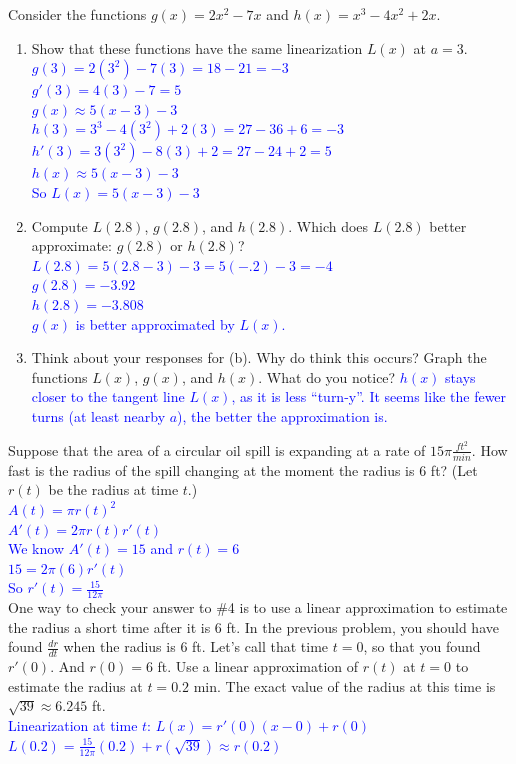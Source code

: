 \documentclass{ximera}
\begin{document}
\begin{exercise}
   Consider the functions $g(x)=2x^{2}-7x$ and $h(x)=x^{3}-4x^{2}+2x$. 
   \begin{enumerate}
       \item Show that these functions have the same linearization $L(x)$ at $a=3$.
        \textcolor{blue}{ $g(3)=2(3^2)-7(3)=18-21=-3$\\
        $g'(3)=4(3)-7=5$\\
        $g(x)\approx 5(x-3)-3$\\
        $h(3)=3^3-4(3^2)+2(3)=27-36+6=-3$\\
        $h'(3)=3(3^2)-8(3)+2=27-24+2=5$\\
        $h(x)\approx 5(x-3)-3$\\
        So $L(x)=5(x-3)-3$}
    
        
        \item Compute $L(2.8)$, $g(2.8)$, and $h(2.8)$. Which does $L(2.8)$ better approximate: $g(2.8)$ or $h(2.8)$? \\
        \textcolor{blue}{ $L(2.8)=5(2.8-3)-3=5(-.2)-3=-4$\\
        $g(2.8)=-3.92$\\
        $h(2.8)=-3.808$\\
        $g(x)$ is better approximated by $L(x)$.}
        
        \item Think about your responses for (b). Why do think this occurs? Graph the functions $L(x)$, $g(x)$, and $h(x)$. What do you notice?
        \textcolor{blue}{ $h(x)$ stays closer to the tangent line $L(x)$, as it is less ``turn-y''.  It seems like the fewer turns (at least nearby $a$), the better the approximation is.}
   \end{enumerate}
\end{exercise}

\begin{exercise}
   Suppose that the area of a circular oil spill is expanding at a rate of $15\pi \frac{ft^2}{min}$.  How fast is the radius of the spill changing at the moment the radius is 6 ft? (Let $r(t)$ be the radius at time $t$.) \\
   \textcolor{blue} {$A(t)=\pi r(t)^2$ \\
   $A'(t)=2\pi r(t)r'(t)$\\
   We know $A'(t)=15$ and $r(t)=6$\\
   $15=2\pi (6)r'(t)$\\
   So $r'(t)=\frac{15}{12\pi}$ }
\\
One way to check your answer  to \#4 is to use a linear approximation to estimate the radius a short time after it is 6 ft. In the previous problem, you should have found $\frac{dr}{dt}$ when the radius is $6$ ft. Let's call that time $t=0$, so that you found $r'(0).$ And $r(0)=6$ ft. Use a linear approximation of $r(t)$ at $t=0$ to estimate the radius at $t=0.2$ min. The exact value of the radius at this time is $\sqrt{39}\approx 6.245$ ft.\\
\textcolor{blue}{ Linearization at time $t$: $L(x)=r'(0)(x-0)+r(0)$\\
$L(0.2)=\frac{15}{12\pi}(0.2)+r(\sqrt{39})\approx r(0.2)$}
\end{exercise}
\end{document}
